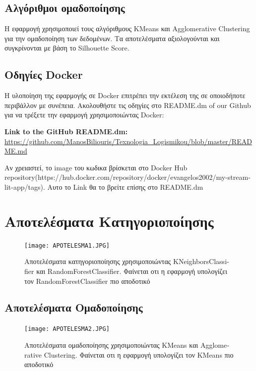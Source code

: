\documentclass[a4paper,12pt]{article}
\begin{document}
\subsection{Αλγόριθμοι ομαδοποίησης}
Η εφαρμογή χρησιμοποιεί τους αλγόριθμους \textlatin{KMeans} και \textlatin{Agglomerative Clustering} για την ομαδοποίηση των δεδομένων. Τα αποτελέσματα αξιολογούνται και συγκρίνονται με βάση το \textlatin{Silhouette Score}.

\subsection{Οδηγίες \textlatin{Docker}}
Η υλοποίηση της εφαρμογής σε \textlatin{Docker} επιτρέπει την εκτέλεση της σε οποιοδήποτε περιβάλλον με συνέπεια. Ακολουθήστε τις οδηγίες στο \textlatin{README.dm of our Github} για να τρέξετε την εφαρμογή χρησιμοποιώντας \textlatin{Docker}:

\begin{center}
    \textbf{\textlatin{Link to the GitHub README.dm}:} \href{https://github.com/ManosBiliouris/Texnologia_Logismikou/blob/master/README.md}{\textlatin{https://github.com/ManosBiliouris/Texnologia_Logismikou/blob/master/README.md}}
\end{center}



Αν χρειαστεί, το \textlatin{image} του κωδικα βρίσκεται στο \textlatin{Docker Hub repository(https://hub.docker.com/repository/docker/evangelos2002/my-streamlit-app/tags)}. Αυτο το Link θα το βρείτε επίσης στο \textlatin{README.dm}

\section{Αποτελέσματα Κατηγοριοποίησης}
\begin{figure}[h!]
\centering
\texttt{[image: APOTELESMA1.JPG]}
\caption{Αποτελέσματα κατηγοριοποίησης χρησιμοποιώντας \textlatin{KNeighborsClassifier} και \textlatin{RandomForestClassifier}. Φαίνεται οτι η εφαρμογή υπολογίζει τον \textlatin{RandomForestClassifier} πιο αποδοτικό }
\end{figure}

\subsection{Αποτελέσματα Ομαδοποίησης}
\begin{figure}[h!]
\centering
\texttt{[image: APOTELESMA2.JPG]}
\caption{Αποτελέσματα ομαδοποίησης χρησιμοποιώντας \textlatin{KMeans} και \textlatin{Agglomerative Clustering}. Φαίνεται οτι η εφαρμογή υπολογίζει τον \textlatin{KMeans} πιο αποδοτικό}
\end{figure}
\end{document}
